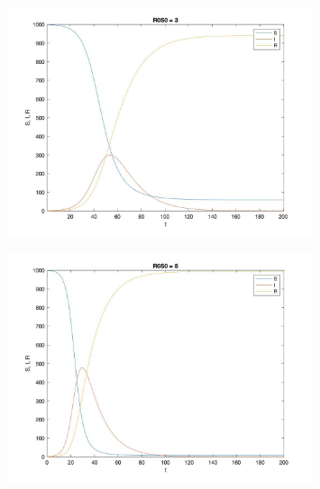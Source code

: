 \documentclass[11pt,fleqn]{exam}
\begin{document}
\begin{figure}[H]
  	\centering
  	\includegraphics[width=0.8\textwidth]{q83.jpg}
\end{figure}	

\begin{figure}[H]
  	\centering
  	\includegraphics[width=0.8\textwidth]{q84.jpg}
\end{figure}	
\end{document}
